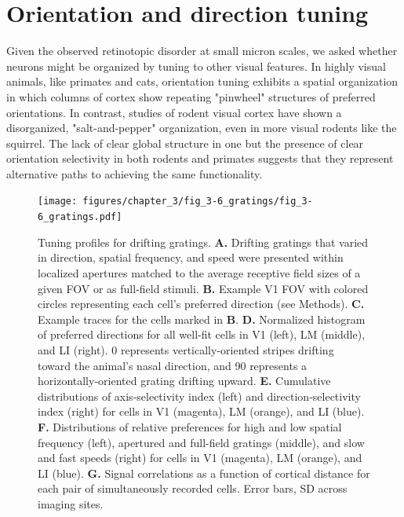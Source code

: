  

\section{Orientation and direction tuning}
Given the observed retinotopic disorder at small micron scales, we asked whether neurons might be organized by tuning to other visual features. In highly visual animals, like primates and cats, orientation tuning exhibits a spatial organization in which columns of cortex show repeating "pinwheel" structures of preferred orientations. In contrast, studies of rodent visual cortex have shown a disorganized, "salt-and-pepper" organization\cite{Ohki2005}, even in more visual rodents like the squirrel\cite{VanHooser2005FunctionalRodent}. The lack of clear global structure in one but the presence of clear orientation selectivity in both rodents and primates suggests that they represent alternative paths to achieving the same functionality.

\begin{figure}[t!]
    \texttt{[image: figures/chapter\_3/fig\_3-6\_gratings/fig\_3-6\_gratings.pdf]}
    \vspace{.1in}
    \caption[Responses to drifting gratings]{Tuning profiles for drifting gratings.
    \textbf{A.} Drifting gratings that varied in direction, spatial frequency, and speed were presented within localized apertures matched to the average receptive field sizes of a given FOV or as full-field stimuli.
    \textbf{B.} Example V1 FOV with colored circles representing each cell's preferred direction (see Methods).
    \textbf{C.} Example traces for the cells marked in \textbf{B}. 
    \textbf{D.} Normalized histogram of preferred directions for all well-fit cells in V1 (left), LM (middle), and LI (right). 0 represents vertically-oriented stripes drifting toward the animal's nasal direction, and 90 represents a horizontally-oriented grating drifting upward.
    \textbf{E.} Cumulative distributions of axis-selectivity index (left) and direction-selectivity index (right) for cells in V1 (magenta), LM (orange), and LI (blue).
    \textbf{F.} Distributions of relative preferences for high and low spatial frequency (left), apertured and full-field gratings (middle), and slow and fast speeds (right) for cells in V1 (magenta), LM (orange), and LI (blue).
    \textbf{G.} Signal correlations as a function of cortical distance for each pair of simultaneously recorded cells. Error bars, SD across imaging sites.  
    \label{fig:gratings}}
\end{figure}


